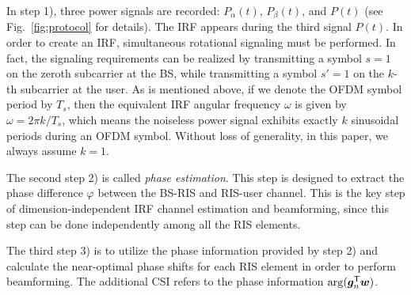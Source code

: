 \documentclass[journal,twocolumn]{IEEEtran}
\theoremstyle{nonumberplain}
\def \T {\bm \Theta}
\def \T {^{\mathsf{T}}}
\newcommand{\red}[1]{{\color{red}{#1}}}
\begin{document}
    In step 1), three power signals are recorded: $P_{\alpha}(t)$, $P_{\beta}(t)$, and $P(t)$ (see Fig.~\ref{fig:protocol} for details). The IRF appears during the third signal $P(t)$. 
    In order to create an IRF, simultaneous rotational signaling must be performed. 
    In fact, the signaling requirements can be realized by transmitting a symbol $s=1$ on the zeroth subcarrier at the BS, while transmitting a symbol $s'=1$ on the $k$-th subcarrier at the user. 
    As is mentioned above, if we denote the OFDM symbol period by $T_s$, then the equivalent IRF angular frequency $\omega$ is given by $\omega = 2\pi k /T_s$, which means the noiseless power signal exhibits exactly $k$ sinusoidal periods during an OFDM symbol. 
    Without loss of generality, in this paper, we always assume $k=1$. 
    \red{In fact, for multi-antenna MIMO systems, rotating pilot symbols at different frequencies $k$ can be simultaneously transmitted by different antennas to enable CSI acquisition.  
    Then, multi-antenna CSI acquisition can be fulfilled by performing Fourier analysis on the composite IRF power signal $P(t)$, and extracting the phase angles for each antenna at distinct frequencies. 
    Similarly, this pseudo-frequency division idea can be extended to multi-user MIMO systems, where different users can also be distinguished by different IRF frequencies. Fortunately, since different users are usually separated in the angular domain from the RIS's perspective, these users can be further identified by performing joint detection and estimation across all the RIS sensors. The joint CSI estimation is beyond the scope of this paper, and is left for our future work. }

    The second step 2) is called {\it phase estimation}. This step is designed to extract the phase difference $\varphi$ between the BS-RIS and RIS-user channel. 
    This is the key step of dimension-independent IRF channel estimation and beamforming, since this step can be done independently among all the RIS elements. 

    The third step 3) is to utilize the phase information provided by step 2) and calculate the near-optimal phase shifts for each RIS element in order to perform beamforming. The additional CSI refers to the phase information ${\rm arg}({\bm g}_n\T {\bm w})$. 
\end{document}

